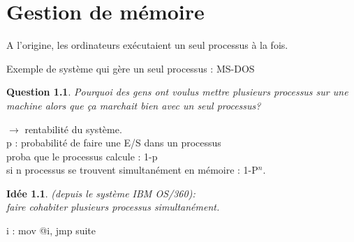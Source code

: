 \documentclass[12pt,a4paper]{report}
\newtheorem*{q}{Question}
\newtheorem*{id}{Idée}
\begin{document}
\chapter{Gestion de mémoire}

A l'origine, les ordinateurs exécutaient un seul processus à la fois.

\begin{center}
\end{center}
Exemple de système qui gère un seul processus : MS-DOS\\

\begin{q}Pourquoi des gens ont voulus mettre plusieurs processus sur une machine alors que ça marchait bien avec un seul processus?\end{q}
$\longrightarrow$ rentabilité du système.\\

p : probabilité de faire une E/S dans un processus\\
proba que le processus calcule : 1-p\\
si n processus se trouvent simultanément en mémoire : 1-P$^n$.\\

\begin{id} (depuis le système IBM OS/360):\\
faire cohabiter plusieurs processus simultanément. 
\end{id}

\begin{center}
\end{center}
\begin{verbatimtab}
 i :
 mov @i, %
 jmp suite
\end{verbatimtab}
\end{document}
